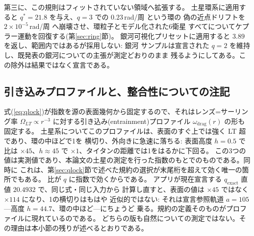 \documentclass[a4paper,10pt,twocolumn]{ltjsarticle}
\begin{document}
第三に、この規則はフィットされていない領域へ拡張する。
土星環系に適用すると $q^{*}=21.8$ を与え、$q=3$ での $0.23$\,rad/周 という環の
偽の近点ドリフトを $2\times10^{-5}$\,rad/周 へ崩壊させ、環粒子とモデル化された6衛星
すべてについてケプラー運動を回復する(第\ref{sec:ring}節)。
銀河可視化プリセットに適用すると $3.89$ を返し、範囲内ではあるが採用しない: 銀河
サンプルは宣言された $q=2$ を維持し、既発表の銀河についての主張が測定どおりのまま
残るようにしてある。この除外は結果ではなく宣言である。

\subsection{引き込みプロファイルと、整合性についての注記}
\label{sec:mm}

式(\ref{eq:qlock})が指数を源の表面幾何から固定するので、それはレンズ=サーリング率
$\Omega_{LT}\propto r^{-3}$ に対する引き込み(entrainment)プロファイル
$\omega_{\mathrm{drag}}(r)$ の形も固定する。
土星系についてこのプロファイルは、表面のすぐ上では強く LT 超であり、環の中ほどで1を
横切り、外向きに急速に落ちる: 表面高度 $h=0.5$ で比は $\times45$、$h\approx45$ で
$\times1$、タイタンの距離では1をはるかに下回る。
この3つの値は実測値であり、本論文の土星の測定を行った指数のもとでのものである。同時に
これは、第\ref{sec:qlock}節で述べた規約の選択が末尾桁を超えて効く唯一の箇所でもある。
比が $q$ に指数で効くからである。
アプリが現在宣言する $q_{\mathrm{exact}}$ 直値 $20.4932$ で、同じ式・同じ入力から
計算し直すと、表面の値は $\times45$ ではなく $\times114$ になり、1の横切りはもはや
近似的ではない: それは宣言参照軌道 $a=105$---高度 $h=44.7$、環の中ほど---にちょうど
乗る。規約の定義そのものがプロファイルに現れているのである。
どちらの版も自然についての測定ではない。その理由は本小節の残りが述べるとおりである。
\end{document}
